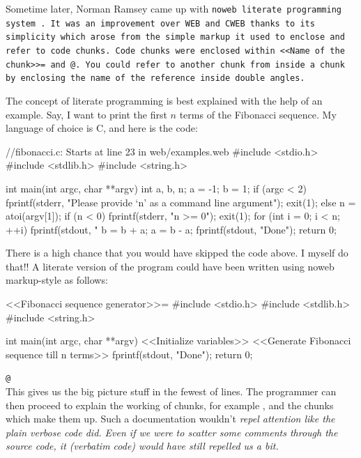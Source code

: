Sometime later, Norman Ramsey came up with \tt noweb \rm literate programming system 
\cite{ramsey1994literate}. It was an improvement over \tt WEB \rm and \tt CWEB \rm thanks to its simplicity
which arose from the simple markup it used to enclose and refer to code chunks. Code chunks were enclosed
within \texttt{<<Name of the chunk>>=} and \texttt{@}. You could refer to another chunk from inside a chunk by
enclosing the name of the reference inside double angles.

The concept of literate programming is best explained with the help of an example. Say, I want to print the
first $n$ terms of the Fibonacci sequence. My language of choice is C, and here is the code:

\begin{vcode}
//fibonacci.c: Starts at line 23 in web/examples.web
#include <stdio.h>
#include <stdlib.h>
#include <string.h>

int main(int argc, char **argv)
{
    int a, b, n;
    a = -1;
    b = 1;
    if (argc < 2) {
        fprintf(stderr, "Please provide `n' as a command line argument\n");
        exit(1);
    }
    else {
        n = atoi(argv[1]);
    }
    if (n < 0) {
        fprintf(stderr, "n >= 0\n");
        exit(1);
    }
    for (int i = 0; i < n; ++i) {
        fprintf(stdout, "%
        b = b + a;
        a = b - a;
    }
    fprintf(stdout, "Done\n");
    return 0;
}
\end{vcode}

There is a high chance that you would have skipped the code above. I myself do that!! A literate version of
the program could have been written using noweb markup-style as follows:

\begin{vcode}
<<Fibonacci sequence generator>>=
#include <stdio.h>
#include <stdlib.h>
#include <string.h>

int main(int argc, char **argv)
{
    <<Initialize variables>>
    <<Generate Fibonacci sequence till n terms>>
    fprintf(stdout, "Done\n");
    return 0;
}
\end{vcode}
\verb|@|\\

This gives us the big picture stuff in the fewest of lines. The programmer can then proceed to explain the
working of chunks, for example , and the chunks which make them up. Such a
documentation wouldn't \it repel \rm attention like the plain verbose code did. Even if we were to scatter
some comments through the source code, it (verbatim code) would have still repelled us a bit.\\

